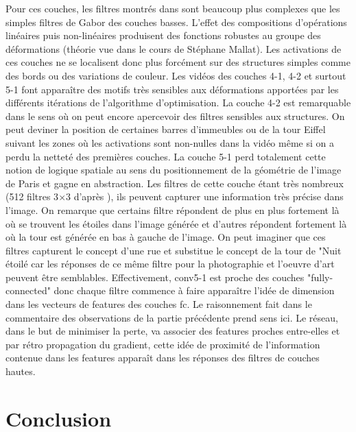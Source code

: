 \documentclass{article}
\begin{document}
Pour ces couches, les filtres montrés dans \cite{DBLP:journals/corr/ZeilerF13} sont beaucoup plus complexes que les simples filtres de Gabor des couches basses. L'effet des compositions d'opérations linéaires puis non-linéaires produisent des fonctions robustes au groupe des déformations (théorie vue dans le cours de Stéphane Mallat). Les activations de ces couches ne se localisent donc plus forcément sur des structures simples comme des bords ou des variations de couleur. Les vidéos des couches 4-1, 4-2 et surtout 5-1 font apparaître des motifs très sensibles aux déformations apportées par les différents itérations de l'algorithme d'optimisation. La couche 4-2 est remarquable dans le sens où on peut encore apercevoir des filtres sensibles aux structures. On peut deviner la position de certaines barres d'immeubles ou de la tour Eiffel suivant les zones où les activations sont non-nulles dans la vidéo même si on a perdu la netteté des premières couches. La couche 5-1 perd totalement cette notion de logique spatiale au sens du positionnement de la géométrie de l'image de Paris et gagne en abstraction. Les filtres de cette couche étant très nombreux (512 filtres 3$\times$3 d'après \cite{DBLP:journals/corr/SimonyanZ14a}), ils peuvent capturer une information très précise dans l'image. On remarque que certains filtre répondent de plus en plus fortement là où se trouvent les étoiles dans l'image générée et d'autres répondent fortement là où la tour est générée en bas à gauche de l'image. On peut imaginer que ces filtres capturent le concept d'une rue et substitue le concept de la tour de "Nuit étoilé car les réponses de ce même filtre pour la photographie et l'oeuvre d'art peuvent être semblables. Effectivement, conv5-1 est proche des couches "fully-connected" donc chaque filtre commence à faire apparaître l'idée de dimension dans les vecteurs de features des couches fc. Le raisonnement fait dans le commentaire des observations de la partie précédente prend sens ici. Le réseau, dans le but de minimiser la perte, va associer des features proches entre-elles et par rétro propagation du gradient, cette idée de proximité de l'information contenue dans les features apparaît dans les réponses des filtres de couches hautes.

 
\section*{Conclusion}
\end{document}
